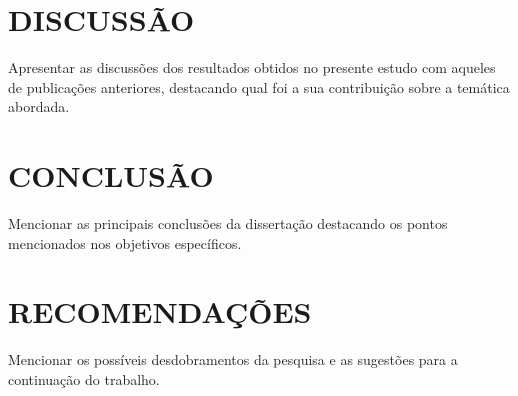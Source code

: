 \lipsum[1-2]

\chapter{DISCUSSÃO}

Apresentar as discussões dos resultados obtidos no presente estudo com aqueles de publicações anteriores, destacando qual foi a sua contribuição sobre a temática abordada.

\chapter{CONCLUSÃO}

Mencionar as principais conclusões da dissertação destacando os pontos mencionados nos objetivos específicos.

\chapter{RECOMENDAÇÕES}

Mencionar os possíveis desdobramentos da pesquisa e as sugestões para a continuação do trabalho.
